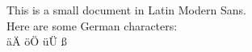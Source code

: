\documentclass{article}
\begin{document}
This is a small document in Latin Modern Sans.
\\
Here are some German characters:
\\
äÄ öÖ üÜ ß
\end{document}

